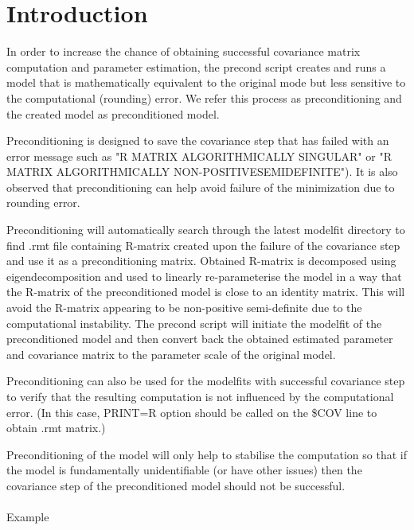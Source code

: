 
\usepackage{color}
\usepackage{amsmath}



\maketitle

\section{Introduction}
In order to increase the chance of obtaining successful covariance matrix computation and parameter estimation, the precond script creates and runs a model that is mathematically equivalent to the original mode but less sensitive to the computational (rounding) error.  We refer this process as preconditioning and the created model as preconditioned model.

Preconditioning is designed to save the covariance step that has failed with an error message such as "R MATRIX ALGORITHMICALLY SINGULAR" or "R MATRIX ALGORITHMICALLY NON-POSITIVESEMIDEFINITE"). It is also observed that preconditioning can help avoid failure of the minimization due to rounding error.

Preconditioning will automatically search through the latest modelfit directory to find .rmt file containing R-matrix created upon the failure of the covariance step and use it as a preconditioning matrix.  Obtained R-matrix is decomposed using eigendecomposition and used to linearly re-parameterise the model in a way that the R-matrix of the preconditioned model is close to an identity matrix.  This will avoid the R-matrix appearing to be non-positive semi-definite due to the computational instability.  The precond script will initiate the modelfit of the preconditioned model and then convert back the obtained estimated parameter and covariance matrix to the parameter scale of the original model.

Preconditioning can also be used for the modelfits with successful covariance step to verify that the resulting computation is not influenced by the computational error.  (In this case, PRINT=R option should be called on the \$COV line to obtain .rmt matrix.)

Preconditioning of the model will only help to stabilise the computation so that if the model is fundamentally unidentifiable (or have other issues) then the covariance step of the preconditioned model should not be successful.
\\
\\
Example 

